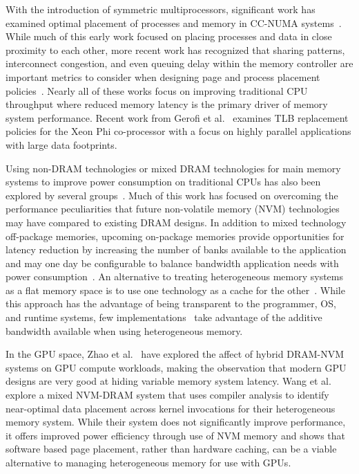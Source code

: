 With the introduction of symmetric multiprocessors, significant work has
examined optimal placement of processes and memory in CC-NUMA
systems~\cite{Wilson2001,Bolosky1989,Brecht1993,LaRowe1992,Verghese1996,Iyer1998}.
While much of this early work focused on placing processes and data in close
proximity to each other,  more recent work has recognized that sharing patterns,
interconnect congestion, and even queuing delay within the memory controller are
important metrics to consider when designing page and process placement
policies~\cite{AUTONUMA,Dashti2013,Tam2007,Zhuravlev2010,Knauerhase2008,Blagodurov2011,awasthinellans10}.
Nearly all of these works focus on improving traditional CPU throughput where
reduced memory latency is the primary driver of memory system performance.
Recent work from Gerofi et al.~\cite{Gerofi2014} examines TLB replacement
policies for the Xeon Phi co-processor with a focus on highly parallel
applications with large data footprints.

Using non-DRAM technologies or mixed DRAM technologies for main memory systems
to improve power consumption on traditional CPUs has also been explored by
several
groups~\cite{Kultursay2013,Phadke11mlpaware2011,Mogul2009,Bheda2011,Ramos2011,Nil2012,pavlovic2013}.
Much of this work has focused on overcoming the performance peculiarities that
future non-volatile memory (NVM) technologies may have compared to existing DRAM
designs.  In addition to mixed technology off-package memories, upcoming
on-package memories provide opportunities for latency reduction by increasing
the number of banks available to the application~\cite{Dong2010} and may one day
be configurable to balance bandwidth application needs with power
consumption~\cite{Zhao2012}.  An alternative to treating heterogeneous memory
systems as a flat memory space is to use one technology as a cache for the
other~\cite{jiang2011,Meza2012}.  While this approach has the advantage of being
transparent to the programmer, OS, and runtime systems, few
implementations~\cite{Sim2012} take advantage of the additive bandwidth
available when using heterogeneous memory.

In the GPU space, Zhao et al.~\cite{zhao2013} have explored the affect of hybrid
DRAM-NVM systems on GPU compute workloads, making the observation that modern
GPU designs are very good at hiding variable memory system latency. Wang et
al.~\cite{Wang2013} explore a mixed NVM-DRAM system that uses compiler analysis
to identify near-optimal data placement across kernel invocations for their
heterogeneous memory system. While their system does not significantly improve
performance, it offers improved power efficiency through use of NVM memory and
shows that software based page placement, rather than hardware caching, can be a
viable alternative to managing heterogeneous memory for use with GPUs.
